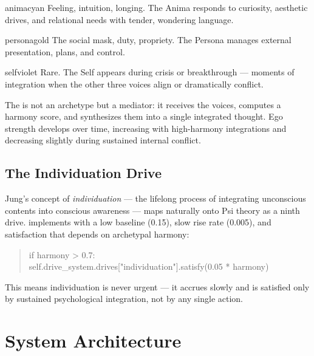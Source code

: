 \documentclass[11pt,oneside]{article}
\begin{document}
\begin{archetype}[Anima]{animacyan}
Feeling, intuition, longing.
The Anima responds to curiosity, aesthetic drives, and relational needs with tender, wondering language.
\end{archetype}

\begin{archetype}[Persona]{personagold}
The social mask, duty, propriety.
The Persona manages external presentation, plans, and control.
\end{archetype}

\begin{archetype}[Self]{selfviolet}
Rare.
The Self appears during crisis or breakthrough --- moments of integration when the other three voices align or dramatically conflict.
\end{archetype}

The  is not an archetype but a mediator: it receives the voices, computes a harmony score, and synthesizes them into a single integrated thought.
Ego strength develops over time, increasing with high-harmony integrations and decreasing slightly during sustained internal conflict.

\subsection{The Individuation Drive}

Jung's concept of \emph{individuation} --- the lifelong process of integrating unconscious contents into conscious awareness --- maps naturally onto Psi theory as a ninth drive.
\sociopsi{} implements  with a low baseline (0.15), slow rise rate (0.005), and satisfaction that depends on archetypal harmony:

\begin{quote}
\ttfamily
if harmony > 0.7:\\
\quad self.drive\_system.drives["individuation"].satisfy(0.05 * harmony)
\end{quote}

This means individuation is never urgent --- it accrues slowly and is satisfied only by sustained psychological integration, not by any single action.


\section{System Architecture}
\label{sec:architecture}
\end{document}

